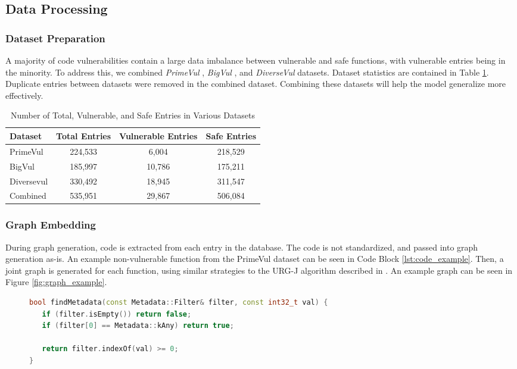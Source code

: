 \documentclass{article}
\begin{document}
\subsection{Data Processing}
\subsubsection{Dataset Preparation}
A majority of code vulnerabilities contain a large data imbalance between vulnerable and safe functions, with vulnerable entries being in the minority. To address this, we combined \textit{PrimeVul} \cite{primevul}, \textit{BigVul} \cite{bigvul}, and \textit{DiverseVul} \cite{diversevul} datasets. Dataset statistics are contained in Table \ref{tab:dataset_entries}. Duplicate entries between datasets were removed in the combined dataset. Combining these datasets will help the model generalize more effectively.
\begin{table}[h]
    \centering
    \begin{tabular}{|l|c|c|c|}
        \hline
        Dataset & Total Entries & Vulnerable Entries & Safe Entries \\
        \hline
        PrimeVul & 224,533 & 6,004 & 218,529 \\
        BigVul & 185,997 & 10,786 & 175,211 \\
        Diversevul & 330,492 & 18,945 & 311,547 \\
        Combined & 535,951 & 29,867 & 506,084 \\
        \hline
    \end{tabular}
    \caption{Number of Total, Vulnerable, and Safe Entries in Various Datasets}
    \label{tab:dataset_entries}
\end{table}

\subsubsection{Graph Embedding}
During graph generation, code is extracted from each entry in the database. The code is not standardized, and passed into graph generation as-is. An example non-vulnerable function from the PrimeVul dataset can be seen in Code Block \ref{lst:code_example}. Then, a joint graph is generated for each function, using similar strategies to the URG-J algorithm described in \cite{jointgraph}. An example graph can be seen in Figure \ref{fig:graph_example}.

\begin{figure}[htbp]
  \centering
  \begin{minipage}{0.95\linewidth}
  \renewcommand{\lstlistingname}{Code Block}
  \begin{lstlisting}[language=C++, caption={Example C++ function that checks for metadata presence.}, label={lst:code_example}]
bool findMetadata(const Metadata::Filter& filter, const int32_t val) {
   if (filter.isEmpty()) return false;
   if (filter[0] == Metadata::kAny) return true;

   return filter.indexOf(val) >= 0;
}
  \end{lstlisting}
  \end{minipage}
\end{figure}
\end{document}
